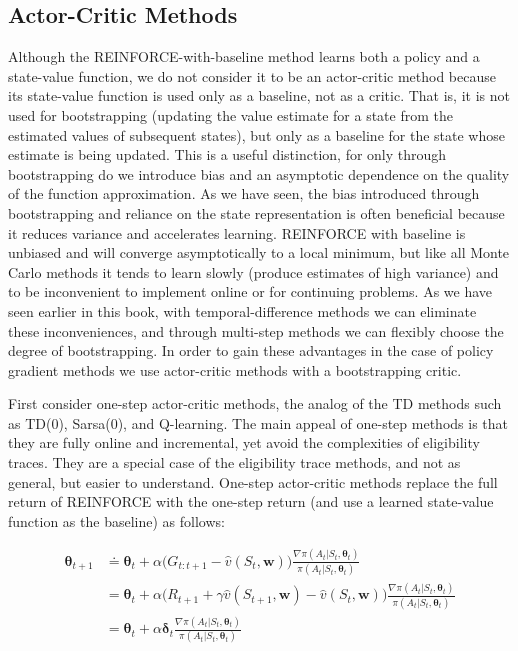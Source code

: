 \documentclass{article}
\begin{document}
\subsection{Actor-Critic Methods}

Although the REINFORCE-with-baseline method learns both a policy and a state-value function, we do not consider it to be an actor-critic method because its state-value function is used only as a baseline, not as a critic. 
That is, it is not used for bootstrapping (updating the value estimate for a state from the estimated values of subsequent states), but only as a baseline for the state whose estimate is being updated. This is a useful distinction, 
for only through bootstrapping do we introduce bias and an asymptotic dependence on the quality of the function approximation. As we have seen, the bias introduced through bootstrapping and reliance on the state representation is often beneficial 
because it reduces variance and accelerates learning. REINFORCE with baseline is unbiased and will converge asymptotically to a local minimum, but like all Monte Carlo methods it tends to learn slowly (produce estimates of high variance) 
and to be inconvenient to implement online or for continuing problems. As we have seen earlier in this book, with temporal-difference methods we can eliminate these inconveniences, and through multi-step methods we can flexibly choose the degree of bootstrapping. 
In order to gain these advantages in the case of policy gradient methods we use actor-critic methods with a bootstrapping critic.

First consider one-step actor-critic methods, the analog of the TD methods such as TD(0), Sarsa(0), and Q-learning. The main appeal of one-step methods is that they are fully online and incremental, yet avoid the complexities of eligibility traces. 
They are a special case of the eligibility trace methods, and not as general, but easier to understand. One-step actor-critic methods replace the full return of REINFORCE with the one-step return (and use a learned state-value function as the baseline) as follows:

$$
\begin{aligned}
\pmb { \theta } _ { t + 1 }
& \doteq \pmb { \theta } _ { t } + \alpha \Big ( G _ { t : t + 1 } - \hat { v } ( S _ { t } \mathbf { , } \mathbf { w } ) \Big ) \frac { \nabla \pi ( A _ { t } | S _ { t } , \pmb { \theta } _ { t } ) } { \pi ( A _ { t } | S _ { t } , \pmb { \theta } _ { t } ) } \\
& = \pmb { \theta } _ { t } + \alpha \Big ( R _ { t + 1 } + \gamma \hat { v } ( S _ { t + 1 } \mathbf { , } \mathbf { w } ) - \hat { v } ( S _ { t } \mathbf { , } \mathbf { w } ) \Big ) \frac { \nabla \pi ( A _ { t } | S _ { t } , \pmb { \theta } _ { t } ) } { \pi ( A _ { t } | S _ { t } , \pmb { \theta } _ { t } ) } \\
& = \pmb { \theta } _ { t } + \alpha \mathbf { \delta } _ { t } \frac { \nabla \pi ( A _ { t } | S _ { t } , \pmb { \theta } _ { t } ) } { \pi ( A _ { t } | S _ { t } , \pmb { \theta } _ { t } ) }
\end{aligned}
$$
\end{document}
